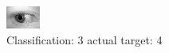 \begin{figure}[h!]
\begin{center}
\includegraphics[width=0.60\columnwidth]{figures/ID735_class_3_target_4.png}
\end{center}
\caption{ Classification: 3 actual target: 4}
\label{fig:ID735_class_3_target_4}
\end{figure}
